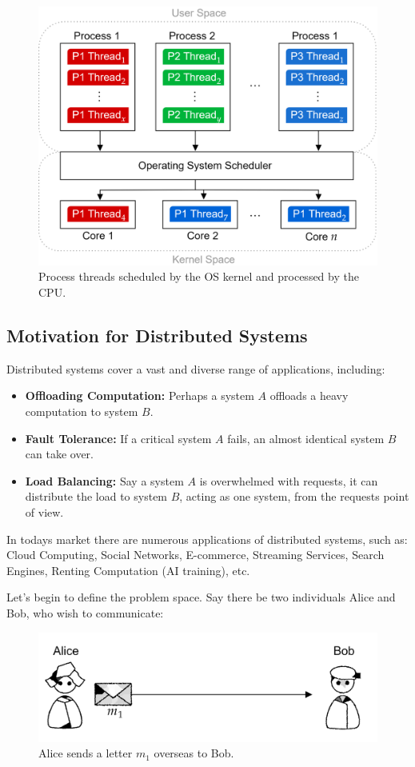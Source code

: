 \begin{figure}[h]
    \centering
    \includegraphics[width=.8\textwidth]{./Sections/high/user_kernel.png}
    \caption{Process threads scheduled by the OS kernel and processed by the CPU.}
\end{figure}

\newpage 

\noindent
\subsection{Motivation for Distributed Systems}

\noindent
Distributed systems cover a vast and diverse range of applications, including:
\begin{itemize}
    \item \textbf{Offloading Computation:} Perhaps a system $A$ offloads a heavy computation to system $B$.
    \item \textbf{Fault Tolerance:} If a critical system $A$ fails, an almost identical system $B$ can take over.
    \item \textbf{Load Balancing:} Say a system $A$ is overwhelmed with requests, it can distribute the load to system $B$, acting as 
    one system, from the requests point of view.
\end{itemize}
In todays market there are numerous applications of distributed systems, such as:
Cloud Computing, Social Networks, E-commerce, Streaming Services, Search Engines, Renting Computation (AI training), etc.

Let's begin to define the problem space. Say there be 
two individuals Alice and Bob, who wish to communicate:\\
\begin{figure}[h]
    \centering
    \includegraphics[width=.8\textwidth]{./Sections/high/com.png}
    \caption{Alice sends a letter $m_1$ overseas to Bob.}
\end{figure}

